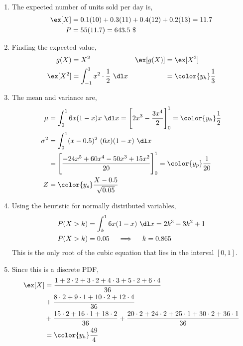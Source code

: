 \begin{enumerate}
    \item The expected number of units sold per day is,
          \begin{align}
              \ex[X] & = 0.1(10) + 0.3(11) + 0.4(12) + 0.2(13) = 11.7 \\
              P      & = 55(11.7) = 643.5\ \$
          \end{align}

    \item Finding the expected value,
          \begin{align}
              g(X)      & = X^2                                        &
              \ex[g(X)] & = \ex[X^2]                                     \\
              \ex[X^2]  & = \int_{-1}^{1} x^2 \cdot \frac{1}{2}\ \dl x &
                        & = \color{y_h} \frac{1}{3}
          \end{align}

    \item The mean and variance are,
          \begin{align}
              \mu      & = \int_{0}^{1} 6x(1-x)x\ \dl x
              = \Bigg[ 2x^3 - \frac{3x^4}{2} \Bigg]_{0}^{1}
              = \color{y_h} \frac{1}{2}                                 \\
              \sigma^2 & = \int_{0}^{1} (x - 0.5)^2\ (6x)(1 - x)\ \dl x \\
                       & = \Bigg[ \frac{-24x^5 + 60x^4-50x^3+15x^2}{20}
                  \Bigg]_{0}^{1}
              = \color{y_p} \frac{1}{20}                                \\
              Z        & = \color{y_s} \frac{X - 0.5}{\sqrt{0.05}}
          \end{align}

    \item Using the heuristic for normally distributed variables,
          \begin{align}
              P(X > k) & = \int_{k}^{1} 6x(1-x)\ \dl x = 2k^3 - 3k^2 + 1 \\
              P(X>k)   & = 0.05  \quad \implies \quad k = 0.865
          \end{align}
          This is the only root of the cubic equation that lies in the interval
          $ [0,1] $.

    \item Since this is a discrete PDF,
          \begin{align}
              \ex[X] & = \frac{1 + 2 \cdot 2 + 3 \cdot 2 + 4 \cdot 3+ 5 \cdot 2
              + 6 \cdot 4}{36}                                                      \\
                     & + \frac{8 \cdot 2 + 9 \cdot 1 + 10 \cdot 2 + 12 \cdot 4}{36} \\
                     & + \frac{15 \cdot 2 + 16 \cdot 1 + 18 \cdot 2}{36}
              + \frac{20 \cdot 2 + 24 \cdot 2 + 25 \cdot 1 + 30 \cdot 2
              + 36 \cdot 1}{36}                                                     \\
                     & = \color{y_h} \frac{49}{4}
          \end{align}


\end{enumerate}
